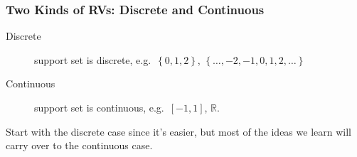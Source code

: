 \begin{frame}
  \frametitle{Two Kinds of RVs: Discrete and Continuous}
  \begin{description}
    \item[Discrete] support set is discrete, e.g.\ $\left\{ 0,1,2 \right\}$,  $\left\{ \hdots, -2, -1, 0, 1, 2,\hdots \right\}$
    \item[Continuous] support set is continuous, e.g.\ $[-1,1]$, $\mathbb{R}$.
  \end{description}

  \vspace{1em}

  \alert{Start with the discrete case since it's easier, but most of the ideas we learn will carry over to the continuous case.}
\end{frame}
